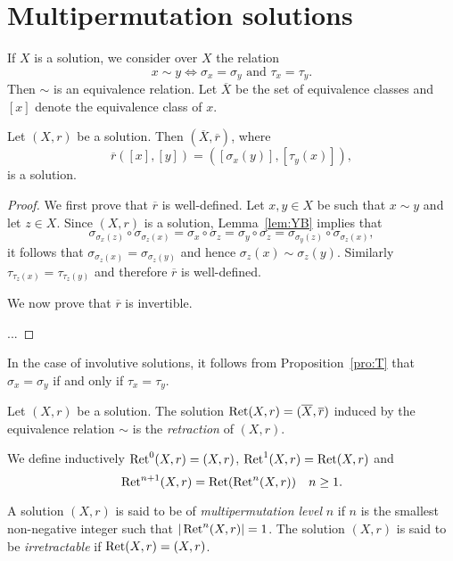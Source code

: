 \chapter{Multipermutation solutions}

If $X$ is a solution, we 
consider over $X$ the relation
\[
x\sim y\Longleftrightarrow \sigma_x=\sigma_y\text{ and }\tau_x=\tau_y.
\]
Then $\sim$ is an equivalence relation. 
Let $\overline{X}$ be the set of equivalence classes 
and $[x]$ 
denote the equivalence class of $x$. 

\begin{proposition}
Let $(X,r)$ be a solution. Then $(\overline{X},\overline{r})$, where 
\[
\overline{r}([x],[y])=([\sigma_x(y)],[\tau_y(x)]),
\]
is a solution. 
\end{proposition}

\begin{proof}
    We first prove that $\overline{r}$ is well-defined. 
    Let $x,y\in X$ be such that $x\sim y$ and let $z\in X$. Since $(X,r)$ is a solution, 
    Lemma~\ref{lem:YB} implies that 
    \[
    \sigma_{\sigma_x(z)}\circ\sigma_{\sigma_z(x)}=\sigma_x\circ\sigma_z=\sigma_y\circ\sigma_z=\sigma_{\sigma_y(z)}\circ\sigma_{\sigma_z(x)},
    \]
    it follows that $\sigma_{\sigma_z(x)}=\sigma_{\sigma_z(y)}$ and hence $\sigma_z(x)\sim\sigma_z(y)$. 
    Similarly $\tau_{\tau_z(x)}=\tau_{\tau_z(y)}$ and therefore 
    $\overline{r}$ is well-defined. 
    
    We now prove that $\overline{r}$ is invertible. 
    
    ...
\end{proof}

In the case of involutive solutions, it follows from Proposition~\ref{pro:T} 
that $\sigma_x=\sigma_y$ if and only if $\tau_x=\tau_y$. 

\begin{definition}
Let $(X,r)$ be a solution. The solution $\operatorname{Ret}(X,r)=(\overline{X},\overline{r})$ induced
by the equivalence relation $\sim$ is the \emph{retraction} of $(X,r)$.
\end{definition}

We define inductively $\operatorname{Ret}^0(X,r)=(X,r)$, $\operatorname{Ret}^1(X,r)=\operatorname{Ret}(X,r)$ and
\[
\operatorname{Ret}^{n+1}(X,r)=\operatorname{Ret}(\operatorname{Ret}^n(X,r))\quad n\geq1.
\]


\begin{definition}
    A solution $(X,r)$ is said to be of \emph{multipermutation level} $n$ 
    if $n$ is the smallest non-negative integer 
    such that $|\operatorname{Ret}^n(X,r)|=1$. The solution $(X,r)$ is said to be 
    \emph{irretractable} if $\operatorname{Ret}(X,r)=(X,r)$. 
\end{definition}

